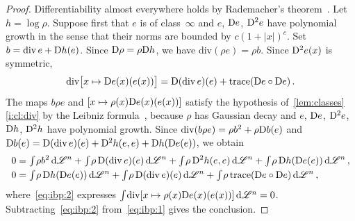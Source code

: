 \documentclass[a4paper,twoside,leqno]{article}
\begin{document}
\begin{proof}
    Differentiability almost everywhere holds by Rademacher's theorem~\cite[3.1.6]{Federer1969}.
    Let $h = \log \rho$. Suppose first that $e$ is of class~$\infty$ and $e$, $\mathrm{D} e$, $\mathrm{D}^2 e$
    have polynomial growth in the sense that their norms are bounded by $c(1 + |x|)^c$. Set $b =
    \mathrm{div}\, e + \mathrm{D} h(e)$. Since $\mathrm{D} \rho = \rho \mathrm{D} h$, we have $\mathrm{div}(\rho e) =
    \rho b$. Since $\mathrm{D}^2 e(x)$ is symmetric,
    \begin{displaymath}
        \mathrm{div} \bigl[ x \mapsto \mathrm{D} e(x)(e(x)) \bigr] = \mathrm{D}(\mathrm{div}\, e)(e) + \operatorname{trace}(\mathrm{D}
        e \circ \mathrm{D} e) \,.
    \end{displaymath}
    The maps $b \rho e$ and $[x \mapsto \rho(x) \mathrm{D} e(x)(e(x))]$ satisfy the hypothesis
    of~\ref{lem:classes}\ref{i:cl:div} by the Leibniz formula~\cite[3.1.11]{Federer1969}, because
    $\rho$ has Gaussian decay and $e$, $\mathrm{D} e$, $\mathrm{D}^2 e$, $\mathrm{D} h$, $\mathrm{D}^2 h$ have polynomial
    growth. Since
    $\mathrm{div}(b \rho e) = \rho b^2 + \rho \mathrm{D} b(e)$ and $\mathrm{D} b(e) = \mathrm{D}(\mathrm{div}\, e)(e) +
    \mathrm{D}^2 h(e,e) + \mathrm{D} h(\mathrm{D} e(e))$, we obtain
    \begin{align}
        0 & = {\textstyle\int_{}^{}} \rho b^2 \,\mathrm{d} \mathscr{L}^{n} + {\textstyle\int_{}^{}} \rho \, \mathrm{D}(\mathrm{div}\, e)(e)
        \,\mathrm{d} \mathscr{L}^{n} + {\textstyle\int_{}^{}} \rho \, \mathrm{D}^2 h(e,e) \,\mathrm{d} \mathscr{L}^{n} + {\textstyle\int_{}^{}} \rho
        \, \mathrm{D} h(\mathrm{D} e(e)) \,\mathrm{d} \mathscr{L}^{n} \,, \label{eq:ibp:1} \\
        0 & = {\textstyle\int_{}^{}} \rho \, \mathrm{D} h(\mathrm{D} e(e)) \,\mathrm{d} \mathscr{L}^{n} + {\textstyle\int_{}^{}} \rho \,
        \mathrm{D}(\mathrm{div}\, e)(e) \,\mathrm{d} \mathscr{L}^{n} + {\textstyle\int_{}^{}} \rho \operatorname{trace}(\mathrm{D} e \circ \mathrm{D} e) \,\mathrm{d}
        \mathscr{L}^{n} \,, \label{eq:ibp:2}
    \end{align}
    where~\eqref{eq:ibp:2} expresses ${\textstyle\int_{}^{}} \mathrm{div}[x \mapsto \rho(x) \mathrm{D}
    e(x)(e(x))] \,\mathrm{d} \mathscr{L}^{n} = 0$. Subtracting~\eqref{eq:ibp:2} from~\eqref{eq:ibp:1} gives the
    conclusion.


\end{proof}
\end{document}
